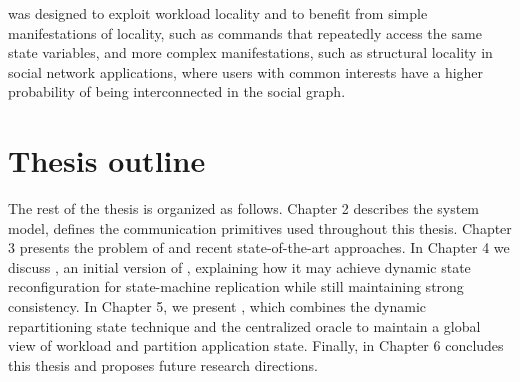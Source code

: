 \dynastar was designed to exploit workload locality and to benefit from simple
manifestations of locality, such as commands that repeatedly access the same
state variables, and more complex manifestations, such as structural locality in
social network applications, where users with common interests have a higher
probability of being interconnected in the social graph.

\section{Thesis outline}
\label{sec:structure}
The rest of the thesis is organized as follows. Chapter 2 describes the system
model, defines the communication primitives used throughout this thesis. Chapter
3 presents the problem of \smr and recent state-of-the-art approaches. In
Chapter 4 we discuss \dssmr, an initial version of \dynastar, explaining how it
may achieve dynamic state reconfiguration for state-machine replication while
still maintaining strong consistency. In Chapter 5, we present \dynastar, which
combines the dynamic repartitioning state technique and the centralized oracle
to maintain a global view of workload and partition application state. Finally,
in Chapter 6 concludes this thesis and proposes future research
directions.
